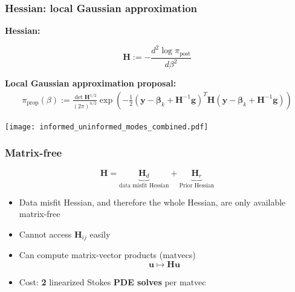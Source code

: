 \documentclass[10pt,final,xcolor=dvipsnames]{beamer}
\newcommand{\bs}[1]{\ensuremath{\boldsymbol{#1}}}
\begin{document}
\begin{frame}
	\frametitle{Hessian: local Gaussian approximation}
	
	\newcommand{\proposal}{\bs y}
	\newcommand{\params}{\bs m}
	
	\textbf{Hessian:}
	
	$$\mathbf{H} := -\frac{d^2 \log \pi_\text{post}}{d \beta^2}$$
	
	
	\textbf{Local Gaussian approximation proposal:}
	\begin{align*}
	\pi_\text{prop}(\beta) := \frac { \det \bs H^{1/2} }{(2\pi)^{n/2} }
	\exp \left( - \frac 12 \left( \proposal - \bs{\beta}_k + \bs H^{-1} \bs
	g \right) ^T \bs H \left( \proposal - \bs{\beta}_k + \bs H^{-1} \bs g \right)
	\right)
	\end{align*}
	
	\vspace{0.25cm}
	
	\begin{center}
		\texttt{[image: informed\_uninformed\_modes\_combined.pdf]}
	\end{center}
\end{frame}
\begin{frame}
	\frametitle{Matrix-free}
	
	$$\mathbf{H} = \underbrace{\mathbf{H}_d}_{\text{data misfit Hessian}} + \underbrace{\mathbf{H}_r}_\text{Prior Hessian}$$
	
	\begin{itemize}
		\setlength\itemsep{2em}
		\item Data misfit Hessian, and therefore the whole Hessian, are only available matrix-free
		\item Cannot access $\mathbf{H}_{ij}$ easily
		\item Can compute matrix-vector products (matvecs)
			$$\mathbf{u} \mapsto \mathbf{H} \mathbf{u}$$
		\item Cost: \textbf{2} linearized Stokes \textbf{PDE solves} per matvec
	\end{itemize}
	
\end{frame}
\end{document}
